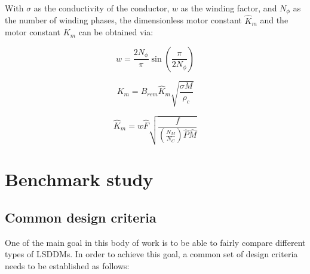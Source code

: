         
        With $\sigma$ as the conductivity of the conductor, $w$ as the winding factor, and $N_{\phi}$ as the number of winding phases, the dimensionless motor constant ${\hat K}_m$ and the motor constant $K_m$ can be obtained via:


        \begin{equation}
            w = \frac{{2{N_\phi }}}{\pi }\sin \left( {\frac{\pi }{{2{N_\phi }}}} \right)
            \label{eq:winding factor}
        \end{equation}
        
        
        \begin{equation}
            {K_m} = {B_{rem}}{\hat K_m}\sqrt {\frac{{\sigma M}}{{{\rho _c}}}}
            \label{eq:K_m}
        \end{equation}
        
        
        \begin{equation}
            {\hat K_m} = w\hat F\sqrt {\frac{f}{{( {\frac{{{N_M}}}{{{N_C}}}} )\hat P\hat M}}}
            \label{eq:K_m dimless}
        \end{equation}
           
        
\section{Benchmark study}                       \label{Chapter:PMLSM design HM/benchmark study}


    \subsection{Common design criteria}         \label{Chapter:PMLSM design HM/design optimization/design citeria}
    
    
        One of the main goal in this body of work is to be able to fairly compare different types of \acsp{LSDDM}. In order to achieve this goal, a common set of design criteria needs to be established as follows:
        
